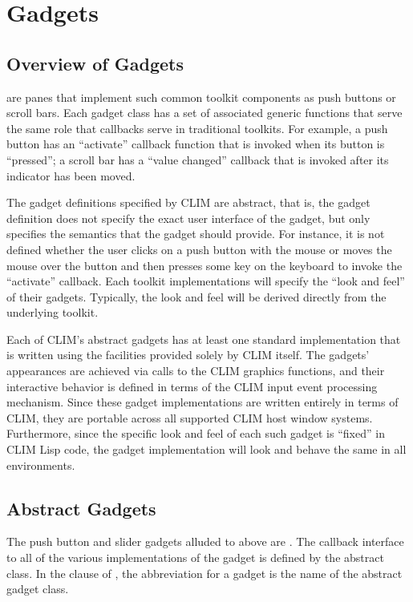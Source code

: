 \chapter {Gadgets}
\label {gadgets}

\section {Overview of Gadgets}

 are panes that implement such common toolkit components as
push buttons or scroll bars.  Each gadget class has a set of associated generic
functions that serve the same role that callbacks serve in traditional toolkits.
For example, a push button has an ``activate'' callback function that is invoked
when its button is ``pressed''; a scroll bar has a ``value changed'' callback
that is invoked after its indicator has been moved.

The gadget definitions specified by CLIM are abstract, that is, the gadget
definition does not specify the exact user interface of the gadget, but only
specifies the semantics that the gadget should provide.  For instance, it is not
defined whether the user clicks on a push button with the mouse or moves the
mouse over the button and then presses some key on the keyboard to invoke the
``activate'' callback.  Each toolkit implementations will specify the ``look and
feel'' of their gadgets.  Typically, the look and feel will be derived directly
from the underlying toolkit.

Each of CLIM's abstract gadgets has at least one standard implementation that is
written using the facilities provided solely by CLIM itself.  The gadgets'
appearances are achieved via calls to the CLIM graphics functions, and their
interactive behavior is defined in terms of the CLIM input event processing
mechanism.  Since these gadget implementations are written entirely in terms of
CLIM, they are portable across all supported CLIM host window systems.
Furthermore, since the specific look and feel of each such gadget is ``fixed''
in CLIM Lisp code, the gadget implementation will look and behave the same in
all environments.


\section {Abstract Gadgets}

The push button and slider gadgets alluded to above are .  The callback interface to all of the various implementations of the
gadget is defined by the abstract class.  In the  clause of
, the abbreviation for a gadget is the name of the
abstract gadget class.

